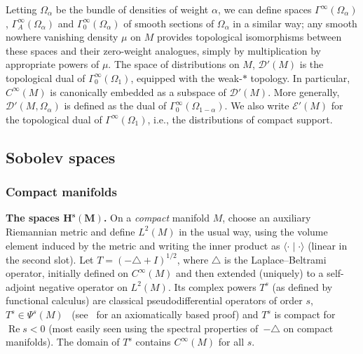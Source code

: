 \documentclass[pdftex]{sigma}
\numberwithin{equation}{section}
\newcommand{\GoinX}[1]{\Gamma_0^\infty({#1})}
\newcommand{\DD}{{\mathscr D}}
\newcommand{\EE}{{\mathscr E}}
\renewcommand{\Re}{\operatorname{Re}}
\begin{document}
 Letting $\Omega_\alpha$ be the bundle of densities of weight $\alpha$, we can define spaces $\Gamma^\infty(\Omega_\alpha)$,
 $\Gamma_A^\infty(\Omega_\alpha)$ and $\GoinX{\Omega_\alpha}$ of smooth sections
 of $\Omega_\alpha$ in a similar way; any smooth nowhere vanishing density $\mu$ on
 $M$ provides topological isomorphisms between these spaces and their zero-weight analogues, simply by multiplication by appropriate powers of $\mu$. The space of distributions on $M$, $\DD'(M)$ is the topological dual of $\GoinX{\Omega_1}$,
 equipped with the weak-$*$ topology. In particular, $C^\infty(M)$ is canonically embedded as a subspace of $\DD'(M)$. More generally,
 $\DD'(M,\Omega_\alpha)$ is defined as the dual of $\GoinX{\Omega_{1-\alpha}}$.
 We also write $\EE'(M)$ for the topological dual of $\Gamma^\infty(\Omega_1)$, i.e.,
 the distributions of compact support.


 \subsection{Sobolev spaces}

 \subsubsection{Compact manifolds}

 {\bf The spaces $\mathbf{H^s(M)}$.}
 On a \emph{compact} manifold $M$, choose an auxiliary Riemannian metric and define $L^2(M)$ in the usual way, using the volume element induced by the metric and writing the inner product as $\langle\cdot\mid\cdot\rangle$ (linear in the second slot). Let $T=(-\triangle + I)^{1/2}$, where $\triangle$ is the Laplace--Beltrami operator, initially defined on $C^\infty(M)$ and then extended (uniquely) to a self-adjoint negative operator on $L^2(M)$.
 Its complex powers $T^s$ (as defined by functional calculus) are classical pseudodifferential operators of order $s$, $T^s\in\Psi^s(M)$~\cite{Seeley:1967} (see~\cite{Amman_etal:2004} for an axiomatically based proof) and $T^s$ is compact for $\Re s<0$ (most easily seen using the spectral properties of~$-\triangle$ on compact manifolds). The domain of $T^s$ contains $C^\infty(M)$ for all $s$.
\end{document}
